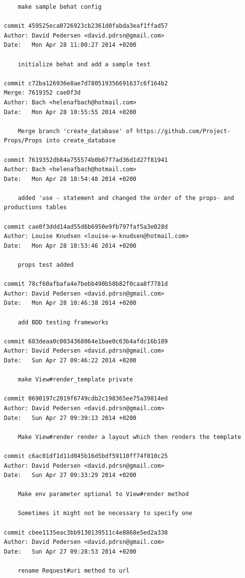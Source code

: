 \documentclass[12pt]{article}
\begin{document}
\begin{verbatim}
    make sample behat config

commit 459525eca0726923cb2361d0fabda3eaf1ffad57
Author: David Pedersen <david.pdrsn@gmail.com>
Date:   Mon Apr 28 11:00:27 2014 +0200

    initialize behat and add a sample test

commit c72ba126936e8ae7d780519356691637c6f164b2
Merge: 7619352 cae0f3d
Author: Bach <helenafbach@hotmail.com>
Date:   Mon Apr 28 10:55:55 2014 +0200

    Merge branch 'create_database' of https://github.com/Project-Props/Props into create_database

commit 7619352db84a755574b0b67f7ad36d1d27f81941
Author: Bach <helenafbach@hotmail.com>
Date:   Mon Apr 28 10:54:48 2014 +0200

    added 'use - statement and changed the order of the props- and productions tables

commit cae0f3ddd14ad55d6b6950e9fb797faf5a3e028d
Author: Louise Knudsen <louise-w-knudsen@hotmail.com>
Date:   Mon Apr 28 10:53:46 2014 +0200

    props test added

commit 78cf60afbafa4e7bebb490b58b82f0caa8f7781d
Author: David Pedersen <david.pdrsn@gmail.com>
Date:   Mon Apr 28 10:46:38 2014 +0200

    add BDD testing frameworks

commit 683deaa0c0034368064e1bae0c63b4afdc16b189
Author: David Pedersen <david.pdrsn@gmail.com>
Date:   Sun Apr 27 09:46:22 2014 +0200

    make View#render_template private

commit 0690197c2019f6749cdb2c198365ee75a39814ed
Author: David Pedersen <david.pdrsn@gmail.com>
Date:   Sun Apr 27 09:39:13 2014 +0200

    Make View#render render a layout which then renders the template

commit c6ac01df1d11d045b16d5bdf59110ff74f010c25
Author: David Pedersen <david.pdrsn@gmail.com>
Date:   Sun Apr 27 09:33:29 2014 +0200

    Make env parameter optional to View#render method
    
    Sometimes it might not be necessary to specify one

commit cbee1135eac3bb9130139511c4e8868e5ed2a338
Author: David Pedersen <david.pdrsn@gmail.com>
Date:   Sun Apr 27 09:28:53 2014 +0200

    rename Request#uri method to url


\end{verbatim}
\end{document}
